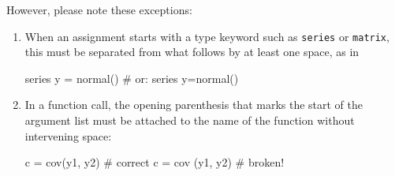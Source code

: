 However, please note these exceptions:
\begin{enumerate}
\item When an assignment starts with a type keyword such as
  \texttt{series} or \texttt{matrix}, this must be separated from what
  follows by at least one space, as in
\begin{code}
series y = normal() # or: series y=normal()
\end{code}
\item In a function call, the opening parenthesis that marks the start
  of the argument list must be attached to the name of the function
  without intervening space:
\begin{code}
c = cov(y1, y2)  # correct
c = cov (y1, y2) # broken!
\end{code}
\end{enumerate}

\label{LastPage}

